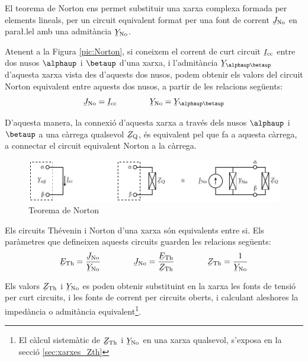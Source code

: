 El teorema de Norton ens permet substituir
una xarxa complexa formada per elements lineals, per un circuit
equivalent format per una font de corrent $\cmplx{J}\ped{No}$ en
para{\l.l}el amb una admit\`{a}ncia $\cmplx{Y}\ped{No}$.

Atenent a la Figura \vref{pic:Norton}, si coneixem el corrent de
curt circuit $\cmplx{I}\ped{cc}$ entre dos nusos $\alphaup$ i $\betaup$
d'una xarxa, i l'admit\`{a}ncia $\cmplx{Y}_{\alphaup\betaup}$ d'aquesta
xarxa vista des d'aquests dos nusos, podem obtenir els valors del
circuit Norton equivalent entre aquests dos nusos, a partir de les
relacions seg\"{u}ents:
\begin{equation}
   \cmplx{J}\ped{No} = \cmplx{I}\ped{cc} \qquad\qquad \cmplx{Y}\ped{No} = \cmplx{Y}_{\alphaup\betaup}
\end{equation}

D'aquesta manera, la connexi\'{o} d'aquesta xarxa a trav\'{e}s dels nusos
$\alphaup$ i $\betaup$ a una c\`{a}rrega qualsevol $\cmplx{Z}\ped{Q}$, \'{e}s
equivalent pel que fa a aquesta c\`{a}rrega, a connectar el circuit
equivalent Norton a la c\`{a}rrega.
\begin{figure}[h]
\centering
    \includegraphics{Imatges/Cap-Fonaments-Norton.pdf}
\caption{Teorema de Norton} \label{pic:Norton}
\end{figure}

Els circuits Th\'{e}venin i Norton d'una xarxa s\'{o}n equivalents entre si.
Els par\`{a}metres que defineixen aquests circuits guarden les relacions
seg\"{u}ents:
\begin{equation}\label{eq:Thevenin-Norton}
   \cmplx{E}\ped{Th} = \frac{\cmplx{J}\ped{No}}{\cmplx{Y}\ped{No}} \qquad\qquad
   \cmplx{J}\ped{No} = \frac{\cmplx{E}\ped{Th}}{\cmplx{Z}\ped{Th}} \qquad\qquad
    \cmplx{Z}\ped{Th} = \frac{1}{\cmplx{Y}\ped{No}}
\end{equation}

Els valors $\cmplx{Z}\ped{Th}$ i  $\cmplx{Y}\ped{No}$ es poden
obtenir substituint en la xarxa  les fonts de tensi\'{o}  per curt
circuits, i les fonts de corrent per circuits oberts, i calculant
aleshores la imped\`{a}ncia o admit\`{a}ncia equivalent\footnote{El c\`{a}lcul sistem\`{a}tic de $\cmplx{Z}\ped{Th}$ i  $\cmplx{Y}\ped{No}$ en una xarxa qualsevol, s'exposa en la secci\'{o} \ref{sec:xarxes_Zth}}.

